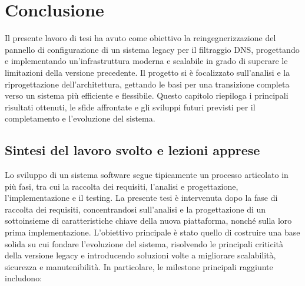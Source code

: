 \chapter{Conclusione}

Il presente lavoro di tesi ha avuto come obiettivo la reingegnerizzazione del pannello di configurazione di un sistema legacy per il filtraggio DNS, progettando e implementando un'infrastruttura moderna e scalabile in grado di superare le limitazioni della versione precedente. Il progetto si è focalizzato sull’analisi e la riprogettazione dell’architettura, gettando le basi per una transizione completa verso un sistema più efficiente e flessibile. Questo capitolo riepiloga i principali risultati ottenuti, le sfide affrontate e gli sviluppi futuri previsti per il completamento e l’evoluzione del sistema.

\section{Sintesi del lavoro svolto e lezioni apprese}
Lo sviluppo di un sistema software segue tipicamente un processo articolato in più fasi, tra cui la raccolta dei requisiti, l’analisi e progettazione, l’implementazione e il testing. La presente tesi è intervenuta dopo la fase di raccolta dei requisiti, concentrandosi sull'analisi e la progettazione di un sottoinsieme di caratteristiche chiave della nuova piattaforma, nonché sulla loro prima implementazione. L’obiettivo principale è stato quello di costruire una base solida su cui fondare l’evoluzione del sistema, risolvendo le principali criticità della versione legacy e introducendo soluzioni volte a migliorare scalabilità, sicurezza e manutenibilità.
%
In particolare, le milestone principali raggiunte includono:

